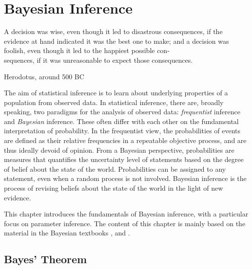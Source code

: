 \chapter{Bayesian Inference}\label{chap:bayesian}

\epigraph{A decision was wise, even though it led to disastrous consequences, if the evidence at hand indicated it was the best one to make; and a decision was foolish, even though it led to the happiest possible con-\\sequences, if it was unreasonable to expect those consequences.}{Herodotus, around 500 BC}


The aim of statistical inference is to learn about underlying properties of a population from observed data.  In statistical inference, there are, broadly speaking, two paradigms for the analysis of observed data: \textit{frequentist} inference and \textit{Bayesian} inference. These often differ with each other on the fundamental interpretation of probability. In the frequentist view, the probabilities of events are defined as their relative frequencies in a repeatable objective process, and are thus ideally devoid of opinion. From a Bayesian perspective, probabilities are measures that quantifies the uncertainty level of statements based on the degree of belief about the state of the world. Probabilities can be assigned to any statement, even when a random process is not involved. Bayesian inference is the process of revising beliefs about the state of the world in the light of new evidence.     

This chapter introduces the fundamentals of Bayesian inference, with a particular focus on parameter inference. The content of this chapter is mainly based on the material in the Bayesian textbooks \cite{BDA}, \cite{BAP} and \cite{Sivia}.


\section{Bayes' Theorem}\label{sec:bayes_paradigm}

